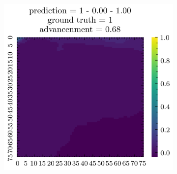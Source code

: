 \documentclass[../document.tex]{subfiles}
\begin{document}
\begin{figure}[H]
\begin{subfigure}[b]{0.19\textwidth}
    \end{subfigure}  
    \begin{subfigure}[b]{0.19\textwidth}
        \includegraphics[width=\linewidth]{../img/5/quarry/best/patch-2d-4.png}
    \end{subfigure}  


\end{figure}
\end{document}
